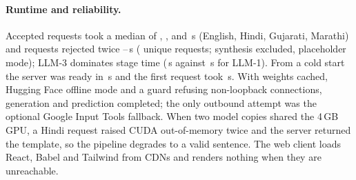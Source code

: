 \paragraph{Runtime and reliability.}
Accepted requests took a median of \LatMedAccEN{}, \LatMedAccHI{}, \LatMedAccGU{} and \LatMedAccMR{}\,s (English, Hindi, Gujarati, Marathi) and requests rejected twice \LatFbMin{}--\LatFbMax{}\,s (\NUniqueReq{} unique requests; synthesis excluded, placeholder mode); LLM-3 dominates stage time (\StageLlmThree{}\,s against \StageLlmOne{}\,s for LLM-1).
From a cold start the server was ready in \OffReady{}\,s and the first request took \OffFirstEn{}\,s.
With weights cached, Hugging Face offline mode and a guard refusing non-loopback connections, generation and prediction completed; the only outbound attempt was the optional Google Input Tools fallback.
When two model copies shared the 4\,GB GPU, a Hindi request raised CUDA out-of-memory twice and the server returned the template, so the pipeline degrades to a valid sentence.
The web client loads React, Babel and Tailwind from CDNs and renders nothing when they are unreachable.
